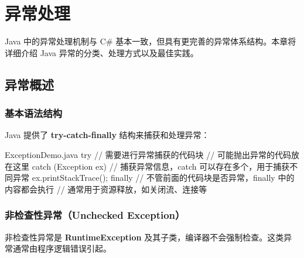 
\chapter{异常处理}

Java 中的异常处理机制与 C\# 基本一致，但具有更完善的异常体系结构。本章将详细介绍 Java 异常的分类、处理方式以及最佳实践。

\section{异常概述}

\subsection{基本语法结构}

Java 提供了 \textbf{try-catch-finally} 结构来捕获和处理异常：

\begin{codeblock}[Java]{ExceptionDemo.java}
try {
    // 需要进行异常捕获的代码块
    // 可能抛出异常的代码放在这里
} catch (Exception ex) {
    // 捕获异常信息，catch 可以存在多个，用于捕获不同异常
    ex.printStackTrace();
} finally {
    // 不管前面的代码块是否异常，finally 中的内容都会执行
    // 通常用于资源释放，如关闭流、连接等
}
\end{codeblock}

\subsection{非检查性异常（Unchecked Exception）}

非检查性异常是 \textbf{RuntimeException} 及其子类，编译器不会强制检查。这类异常通常由程序逻辑错误引起。

